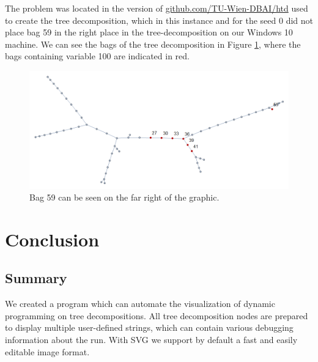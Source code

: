 \documentclass[a4paper, 12pt, bibliography=totoc]{scrartcl}
\begin{document}

The problem was located in the version of \url{github.com/TU-Wien-DBAI/htd} used to create the tree decomposition, which in this instance and for the seed $0$ did not place bag 59 in the right place in the tree-decomposition on our Windows 10 machine. We can see the bags of the tree decomposition in Figure \ref{fig:bag59td}, where the bags containing variable 100 are indicated in red. 

\begin{figure}
	\centering
	\includegraphics[width=0.9\linewidth,height=0.9\textheight,keepaspectratio]{images/stars100var100.png}
	\caption{Bag 59 can be seen on the far right of the graphic.}
	\label{fig:bag59td}
\end{figure}
\newpage
\section{Conclusion}\label{sec:conclusion}
\subsection{Summary}
We created a program which can automate the visualization of dynamic programming on tree decompositions. All tree decomposition nodes are prepared to display multiple user-defined strings, which can contain various debugging information about the run.
With SVG we support by default a fast and easily editable image format.\\
\end{document}
